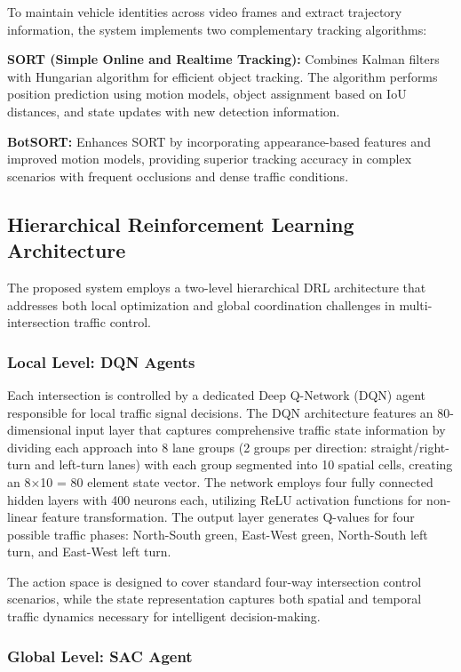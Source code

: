 To maintain vehicle identities across video frames and extract trajectory information, the system 
implements two complementary tracking algorithms:

\textbf{SORT (Simple Online and Realtime Tracking):} Combines Kalman filters with Hungarian algorithm 
for efficient object tracking. The algorithm performs position prediction using motion models, object 
assignment based on IoU distances, and state updates with new detection information.

\textbf{BotSORT:} Enhances SORT by incorporating appearance-based features and improved motion models, 
providing superior tracking accuracy in complex scenarios with frequent occlusions and dense traffic 
conditions.

\subsection{Hierarchical Reinforcement Learning Architecture}\label{subsec2a-3}

The proposed system employs a two-level hierarchical DRL architecture that addresses both local 
optimization and global coordination challenges in multi-intersection traffic control.

\subsubsection{Local Level: DQN Agents}

Each intersection is controlled by a dedicated Deep Q-Network (DQN) agent responsible for local traffic 
signal decisions. The DQN architecture features an 80-dimensional input layer that captures comprehensive 
traffic state information by dividing each approach into 8 lane groups (2 groups per direction: 
straight/right-turn and left-turn lanes) with each group segmented into 10 spatial cells, creating an 
8×10 = 80 element state vector. The network employs four fully connected hidden layers with 400 neurons 
each, utilizing ReLU activation functions for non-linear feature transformation. The output layer 
generates Q-values for four possible traffic phases: North-South green, East-West green, North-South 
left turn, and East-West left turn.

The action space is designed to cover standard four-way intersection control scenarios, while the state 
representation captures both spatial and temporal traffic dynamics necessary for intelligent 
decision-making.

\subsubsection{Global Level: SAC Agent}

